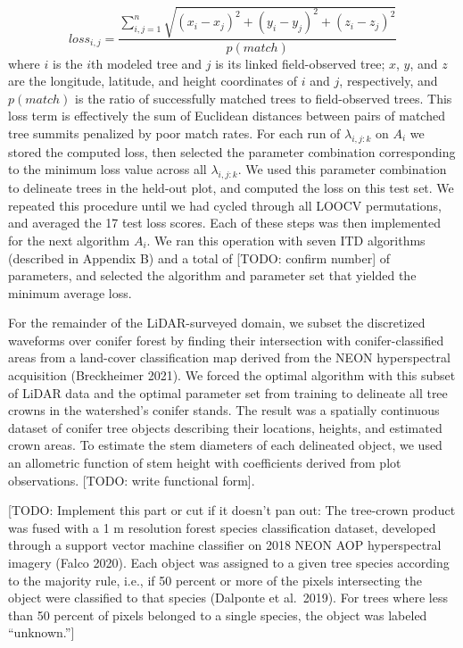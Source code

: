 \documentclass[
  12pt,
]{article}
\begin{document}
\[ loss_{i,j} = \frac{\sum_{i,j=1}^{n}\sqrt{(x_i-x_j)^2+(y_i-y_j)^2+(z_i-z_j)^2}}{p(match)}\]
where \(i\) is the \(i\)th modeled tree and \(j\) is its linked
field-observed tree; \(x\), \(y\), and \(z\) are the longitude,
latitude, and height coordinates of \(i\) and \(j\), respectively, and
\(p(match)\) is the ratio of successfully matched trees to
field-observed trees. This loss term is effectively the sum of Euclidean
distances between pairs of matched tree summits penalized by poor match
rates. For each run of \(\lambda_{i,j:k}\) on \(A_i\) we stored the
computed loss, then selected the parameter combination corresponding to
the minimum loss value across all \(\lambda_{i,j:k}\). We used this
parameter combination to delineate trees in the held-out plot, and
computed the loss on this test set. We repeated this procedure until we
had cycled through all LOOCV permutations, and averaged the 17 test loss
scores. Each of these steps was then implemented for the next algorithm
\(A_{i}\). We ran this operation with seven ITD algorithms (described in
Appendix B) and a total of {[}TODO: confirm number{]} of parameters, and
selected the algorithm and parameter set that yielded the minimum
average loss.

For the remainder of the LiDAR-surveyed domain, we subset the
discretized waveforms over conifer forest by finding their intersection
with conifer-classified areas from a land-cover classification map
derived from the NEON hyperspectral acquisition (Breckheimer 2021). We
forced the optimal algorithm with this subset of LiDAR data and the
optimal parameter set from training to delineate all tree crowns in the
watershed's conifer stands. The result was a spatially continuous
dataset of conifer tree objects describing their locations, heights, and
estimated crown areas. To estimate the stem diameters of each delineated
object, we used an allometric function of stem height with coefficients
derived from plot observations. {[}TODO: write functional form{]}.

{[}TODO: Implement this part or cut if it doesn't pan out: The
tree-crown product was fused with a 1 m resolution forest species
classification dataset, developed through a support vector machine
classifier on 2018 NEON AOP hyperspectral imagery (Falco 2020). Each
object was assigned to a given tree species according to the majority
rule, i.e., if 50 percent or more of the pixels intersecting the object
were classified to that species (Dalponte et al.~2019). For trees where
less than 50 percent of pixels belonged to a single species, the object
was labeled ``unknown.''{]}
\end{document}
